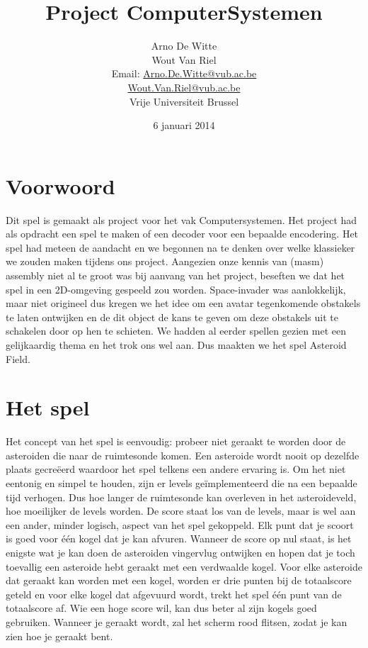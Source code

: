 \documentclass{article}
\title{Project ComputerSystemen}
\author{Arno De Witte \\Wout Van Riel  \\Email: \href{mailto:Arno.De.Witte@vub.ac.be}{Arno.De.Witte@vub.ac.be} \\ \href{mailto:Wout.Van.Riel@vub.ac.be}{Wout.Van.Riel@vub.ac.be} \\ %
Vrije Universiteit Brussel}
\date{6 januari 2014}
\begin{document}
\maketitle
\newpage
\tableofcontents
\newpage


\section{Voorwoord}
Dit spel is gemaakt als project voor het vak Computersystemen.
Het project had als opdracht een spel te maken of een decoder voor een bepaalde encodering.
Het spel had meteen de aandacht en we begonnen na te denken over welke klassieker we zouden maken tijdens ons project.
Aangezien onze kennis van (masm) assembly niet al te groot was bij aanvang van het project, beseften we dat het spel in een 2D-omgeving gespeeld zou worden.
Space-invader was aanlokkelijk, maar niet origineel dus kregen we het idee om een avatar tegenkomende obstakels te laten ontwijken en de dit object de kans te geven om deze obstakels uit te schakelen door op hen te schieten.
We hadden al eerder spellen gezien met een gelijkaardig thema en het trok ons wel aan. Dus maakten we het spel Asteroid Field.

\section{Het spel}\label{spel}

Het concept van het spel is eenvoudig: probeer niet geraakt te worden door de asteroiden die naar de ruimtesonde komen.
Een asteroide wordt nooit op dezelfde plaats gecreëerd waardoor het spel telkens een andere ervaring is.
Om het niet eentonig en simpel te houden, zijn er levels geïmplementeerd die na een bepaalde tijd verhogen.
Dus hoe langer de ruimtesonde kan overleven in het asteroideveld, hoe moeilijker de levels worden.
De score staat los van de levels, maar is wel aan een ander, minder logisch, aspect van het spel gekoppeld.
Elk punt dat je scoort is goed voor één kogel dat je kan afvuren.
Wanneer de score op nul staat, is het enigste wat je kan doen de asteroiden vingervlug ontwijken en hopen dat je toch toevallig een asteroide hebt geraakt met een verdwaalde kogel.
Voor elke asteroide dat geraakt kan worden met een kogel, worden er drie punten bij de totaalscore geteld en voor elke kogel dat afgevuurd wordt, trekt het spel één punt van de totaalscore af.
Wie een hoge score wil, kan dus beter al zijn kogels goed gebruiken.
Wanneer je geraakt wordt, zal het scherm rood flitsen, zodat je kan zien hoe je geraakt bent.
\end{document}
